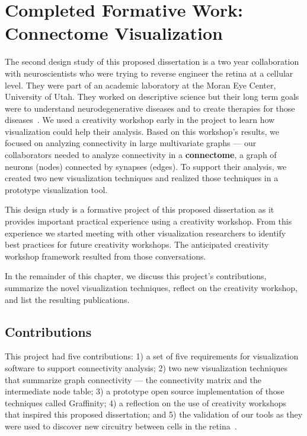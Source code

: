 \chapter{Completed Formative Work: Connectome Visualization}
\label{ch:connectome}

The second design study of this proposed dissertation is a two year collaboration with neuroscientists who were trying to reverse engineer the retina at a cellular level. They were part of an academic laboratory at the Moran Eye Center, University of Utah. They worked on descriptive science but their long term goals were to understand neurodegenerative diseases and to create therapies for those diseases~\cite{Anderson2010}. We used a creativity workshop early in the project to learn how visualization could help their analysis. Based on this workshop's results, we focused on analyzing connectivity in large multivariate graphs --- our collaborators needed to analyze connectivity in a {\bf connectome}, a graph of neurons (nodes) connected by synapses (edges). To support their analysis, we created two new visualization techniques and realized those techniques in a prototype visualization tool.

This design study is a formative project of this proposed dissertation as it provides important practical experience using a creativity workshop. From this experience we started meeting with other visualization researchers to identify best practices for future creativity workshops. The anticipated creativity workshop framework resulted from those conversations. 

In the remainder of this chapter, we discuss this project's contributions, summarize the novel visualization techniques, reflect on the creativity workshop, and list the resulting publications.

\section{Contributions}

This project had five contributions: 1) a set of five requirements for visualization software to support connectivity analysis; 2) two new visualization techniques that summarize graph connectivity --- the connectivity matrix and the intermediate node table; 3) a prototype open source implementation of those techniques called Graffinity; 4) a reflection on the use of creativity workshops that inspired this proposed dissertation; and 5) the validation of our tools as they were used to discover new circuitry between cells in the retina~\cite{Lauritzen2016}.

